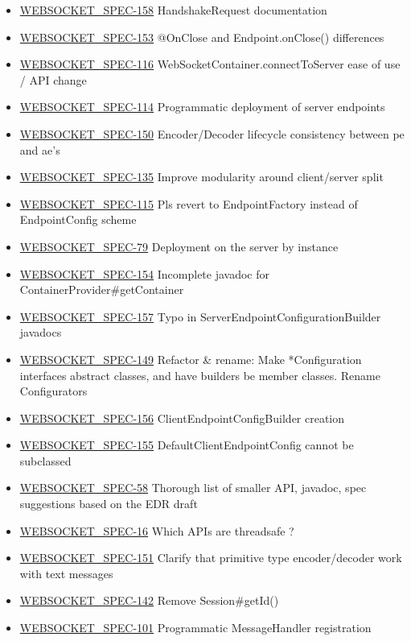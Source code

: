 \begin{itemize}
\item \href {http://java.net/jira/browse/WEBSOCKET_SPEC-158}{WEBSOCKET\_SPEC-158} HandshakeRequest documentation
\item \href {http://java.net/jira/browse/WEBSOCKET_SPEC-153}{WEBSOCKET\_SPEC-153} @OnClose and Endpoint.onClose() differences
\item \href {http://java.net/jira/browse/WEBSOCKET_SPEC-116}{WEBSOCKET\_SPEC-116} WebSocketContainer.connectToServer ease of use / API change
\item \href {http://java.net/jira/browse/WEBSOCKET_SPEC-114}{WEBSOCKET\_SPEC-114} Programmatic deployment of server endpoints
\item \href {http://java.net/jira/browse/WEBSOCKET_SPEC-150}{WEBSOCKET\_SPEC-150} Encoder/Decoder lifecycle consistency between pe and ae's
\item \href {http://java.net/jira/browse/WEBSOCKET_SPEC-135}{WEBSOCKET\_SPEC-135} Improve modularity around client/server split
\item \href {http://java.net/jira/browse/WEBSOCKET_SPEC-115}{WEBSOCKET\_SPEC-115} Pls revert to EndpointFactory instead of EndpointConfig scheme
\item \href {http://java.net/jira/browse/WEBSOCKET_SPEC-79}{WEBSOCKET\_SPEC-79} Deployment on the server by instance
\item \href {http://java.net/jira/browse/WEBSOCKET_SPEC-154}{WEBSOCKET\_SPEC-154} Incomplete javadoc for ContainerProvider\#getContainer
\item \href {http://java.net/jira/browse/WEBSOCKET_SPEC-157}{WEBSOCKET\_SPEC-157} Typo in ServerEndpointConfigurationBuilder javadocs
\item \href {http://java.net/jira/browse/WEBSOCKET_SPEC-149}{WEBSOCKET\_SPEC-149} Refactor \& rename: Make *Configuration interfaces abstract classes, and have builders be member classes. Rename Configurators
\item \href {http://java.net/jira/browse/WEBSOCKET_SPEC-156}{WEBSOCKET\_SPEC-156} ClientEndpointConfigBuilder creation
\item \href {http://java.net/jira/browse/WEBSOCKET_SPEC-155}{WEBSOCKET\_SPEC-155} DefaultClientEndpointConfig cannot be subclassed
\item \href {http://java.net/jira/browse/WEBSOCKET_SPEC-58}{WEBSOCKET\_SPEC-58} Thorough list of smaller API, javadoc, spec suggestions based on the EDR draft
\item \href {http://java.net/jira/browse/WEBSOCKET_SPEC-16}{WEBSOCKET\_SPEC-16} Which APIs are threadsafe ?
\item \href {http://java.net/jira/browse/WEBSOCKET_SPEC-151}{WEBSOCKET\_SPEC-151} Clarify that primitive type encoder/decoder work with text messages
\item \href {http://java.net/jira/browse/WEBSOCKET_SPEC-142}{WEBSOCKET\_SPEC-142} Remove Session\#getId()
\item \href {http://java.net/jira/browse/WEBSOCKET_SPEC-101}{WEBSOCKET\_SPEC-101} Programmatic MessageHandler registration
\end{itemize}


